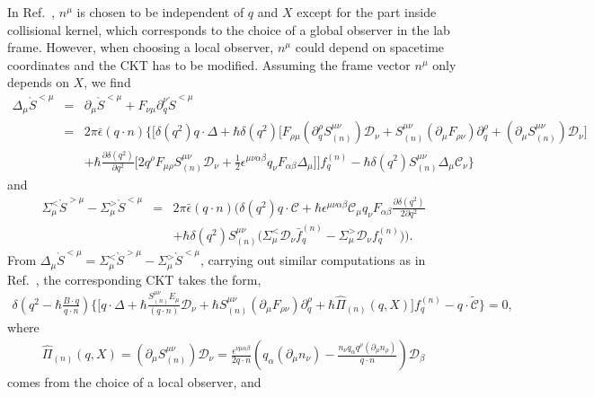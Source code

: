 \documentclass[aps,prd,showkeys,preprint,amsmath,amssymb,nofootinbib]{revtex4-1}
\newcommand{\red}[1]{{\color{red} #1} }
\begin{document}
In Ref.~\cite{Hidaka:2016yjf}, $n^{\mu}$ is chosen to be independent of $q$ and $X$ except for the part inside collisional kernel, which corresponds to the choice of a global observer in the lab frame.
However, when choosing a local observer, $n^{\mu}$ could depend on spacetime coordinates and the CKT has to be modified.  
Assuming the frame vector $n^{\mu}$ only depends on $X$, we find
\begin{eqnarray}\nonumber
\Delta_{\mu}\grave{S}^{<\mu}
&=&\partial_{\mu}\grave{S}^{<\mu}+F_{\nu\mu}\partial^{\nu}_q\grave{S}^{<\mu}
\\\nonumber
&=&2\pi\bar{\epsilon}(q\cdot n)\Bigg\{\Bigg[
\delta(q^2)q\cdot\Delta  
+
\hbar\delta(q^2)\Big[
F_{\rho \mu}\left(\partial^{\rho}_qS^{\mu\nu}_{(n)}\right)\mathcal{D}_{\nu}
+S^{\mu\nu}_{(n)}(\partial_{\mu}F_{\rho \nu})\partial^{\rho}_{q}
+\left(\partial_{\mu}S^{\mu\nu}_{(n)}\right)\mathcal{D}_{\nu}
\Big]
\\
&&
+\hbar\frac{\partial\delta(q^2)}{\partial q^2}
\Big[2q^{\rho}F_{\mu\rho}S^{\mu\nu}_{(n)}\mathcal{D}_{\nu}
+\frac{1}{2}\epsilon^{\mu\nu\alpha\beta}q_{\nu}F_{\alpha\beta}\Delta_{\mu}\Big]
\Bigg]f^{(n)}_q
-\hbar\delta(q^2)S_{(n)}^{\mu\nu}\Delta_{\mu}\mathcal{C}_{\nu}\Bigg\}
\end{eqnarray}
and 
\begin{eqnarray}\nonumber
\Sigma^<_{\mu}\grave{S}^{>\mu}-\Sigma^>_{\mu}\grave{S}^{<\mu}&=&
2\pi\bar{\epsilon}(q\cdot n)\Bigg(\delta(q^2)q\cdot\mathcal{C}+\hbar\epsilon^{\mu\nu\alpha\beta}\mathcal{C}_{\mu} q_{\nu}F_{\alpha\beta}\frac{\partial\delta(q^2)}{2\partial q^2}
\\
&&+\hbar\delta(q^2)S_{(n)}^{\mu\nu}\big(\Sigma^<_{\mu}\mathcal{D}_{\nu}\bar{f}^{(n)}_q
	-\Sigma^>_{\mu}\mathcal{D}_{\nu}f^{(n)}_q\big)
\Bigg).
\end{eqnarray}
From $\Delta_{\mu}\grave{S}^{<\mu}=\Sigma^<_{\mu}\grave{S}^{>\mu}-\Sigma^>_{\mu}\grave{S}^{<\mu}$,
carrying out similar computations as in Ref.~\cite{Hidaka:2016yjf}, the corresponding CKT takes the form,
\begin{eqnarray}\label{CKT_general}
\delta\left(q^2-\hbar\frac{B\cdot q}{q\cdot n}\right)\Bigg\{\Bigg[
q\cdot\Delta+\hbar\frac{S_{(n)}^{\mu\nu}E_{\mu}}{(q\cdot n)}\mathcal{D}_{\nu}
+\hbar S_{(n)}^{\mu\nu}(\partial_{\mu}F_{\rho \nu})\partial^{\rho}_{q}+\hbar\hat{\Pi}_{(n)}(q,X)\Bigg]f^{(n)}_q
-q\cdot\tilde{\mathcal{C}}\Bigg\}=0,
\end{eqnarray}
where
\begin{eqnarray}
\hat{\Pi}_{(n)}(q,X)=\left(\partial_{\mu}S^{\mu\nu}_{(n)}\right)\mathcal{D}_{\nu}=\frac{\epsilon^{\nu\mu\alpha\beta}}{2q\cdot n}\left(q_{\alpha}(\partial_{\mu}n_{\nu})-\frac{n_{\nu}q_{\alpha}q^{\rho}(\partial_{\mu}n_{\rho})}{q\cdot n}\right)\mathcal{D}_{\beta}
\end{eqnarray}
comes from the choice of a local observer, and
\end{document}
